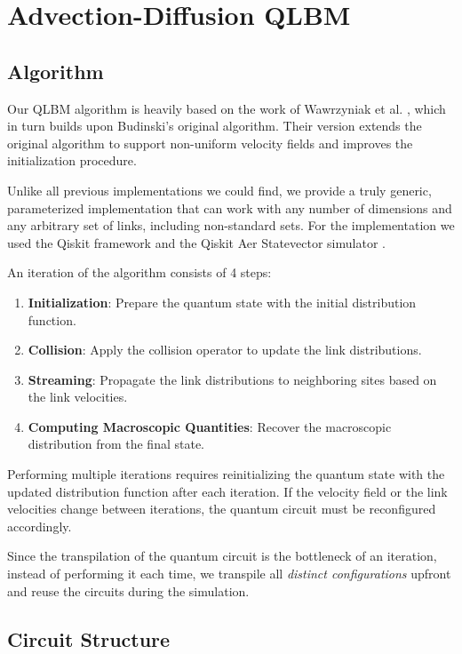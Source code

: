 \chapter{Advection-Diffusion QLBM}
\label{chapter:implementation}

\section{Algorithm}
\label{sec:algorithm}

Our QLBM algorithm is heavily based on the work of Wawrzyniak et al. \cite{wawrzyniak2025base}, which in turn builds upon Budinski's original algorithm.
Their version extends the original algorithm to support non-uniform velocity fields and improves the initialization procedure.

Unlike all previous implementations we could find, we provide a truly generic, parameterized implementation that can work with any number of dimensions and any arbitrary set of links, including non-standard sets.
For the implementation we used the Qiskit framework and the Qiskit Aer Statevector simulator \cite{qiskit2024}.

An iteration of the algorithm consists of 4 steps:
\begin{enumerate}
    \item \textbf{Initialization}: Prepare the quantum state with the initial distribution function.
    \item \textbf{Collision}: Apply the collision operator to update the link distributions.
    \item \textbf{Streaming}: Propagate the link distributions to neighboring sites based on the link velocities.
    \item \textbf{Computing Macroscopic Quantities}: Recover the macroscopic distribution from the final state.
\end{enumerate}

Performing multiple iterations requires reinitializing the quantum state with the updated distribution function after each iteration.
If the velocity field or the link velocities change between iterations, the quantum circuit must be reconfigured accordingly.

Since the transpilation of the quantum circuit is the bottleneck of an iteration, instead of performing it each time, we transpile all \emph{distinct configurations} upfront and reuse the circuits during the simulation.
\section{Circuit Structure}
\label{sec:circuit}

